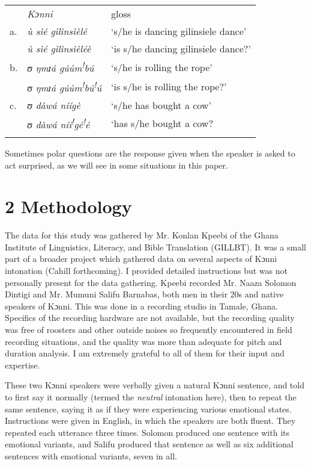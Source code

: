 \documentclass[output=paper]{langsci/langscibook}
\begin{document}
\begin{tabular}{lll} & \emph{Kɔnni } & gloss\\
\lsptoprule
a. & \emph{ù sìé gìlìnsìèlé} & ‘s/he is dancing gilinsiele dance’\\
& \emph{ù sìé gìlìnsìèléè  } & ‘is s/he dancing gilinsiele dance?’\\
b. & \emph{ʊ ŋmɪá gúúm}\textit{\textsuperscript{!}}\emph{bú} & ‘s/he is rolling the rope’\\
& \emph{ʊ ŋmɪá gúúm}\textit{\textsuperscript{!}}\emph{bú}\textit{\textsuperscript{!}}\emph{ú} & ‘is s/he is rolling the rope?’\\
c. & \emph{ʊ dàwá níígè  } & ‘s/he has bought a cow’\\
& \emph{ʊ dàwá níí}\textit{\textsuperscript{!}}\emph{gé}\textit{\textsuperscript{!}}\emph{é  } & ‘has s/he bought a cow?\\
\lspbottomrule
\end{tabular}
Sometimes polar questions are the response given when the speaker is asked to act surprised, as we will see in some situations in this paper. 

\chapter{2 Methodology}
\begin{styleBodyTextIndent}
The data for this study was gathered by Mr. Konlan Kpeebi of the Ghana Institute of Linguistics, Literacy, and Bible Translation (GILLBT). It was a small part of a broader project which gathered data on several aspects of Kɔnni intonation (Cahill forthcoming). I provided detailed instructions but was not personally present for the data gathering. Kpeebi recorded Mr. Naaza Solomon Dintigi and Mr. Mumuni Salifu Barnabas, both men in their 20s and native speakers of Kɔnni. This was done in a recording studio in Tamale, Ghana. Specifics of the recording hardware are not available, but the recording quality was free of roosters and other outside noises so frequently encountered in field recording situations, and the quality was more than adequate for pitch and duration analysis. I am extremely grateful to all of them for their input and expertise.
\end{styleBodyTextIndent}

These two Kɔnni speakers were verbally given a natural Kɔnni sentence, and told to first say it normally (termed the \emph{neutral} intonation here), then to repeat the same sentence, saying it as if they were experiencing various emotional states. Instructions were given in English, in which the speakers are both fluent. They repeated each utterance three times. Solomon produced one sentence with its emotional variants, and Salifu produced that sentence as well as six additional sentences with emotional variants, seven in all.
\end{document}
